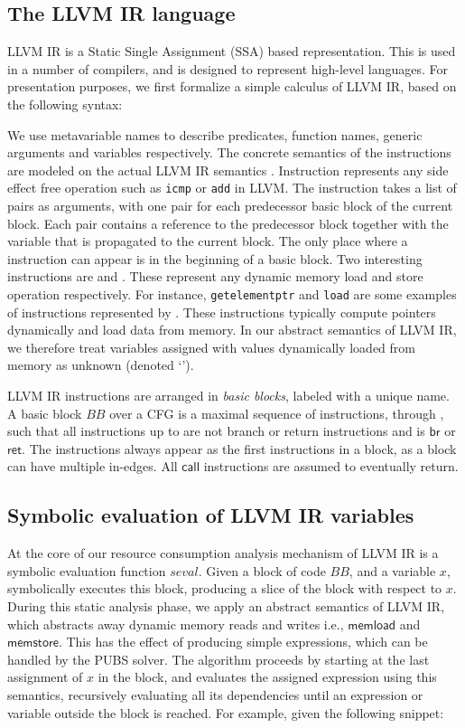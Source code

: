 \documentclass[9pt,preprint]{sigplanconf}
\newcommand{\mathspace}[1]{\ensuremath{#1}\xspace}
\newcommand{\instit}[1]{\mathspace{\mathsf{#1}}}
\newcommand{\aBlock}{\mathspace{\mathit{BB}}}
\newcommand{\aVar}{\mathspace{x}}
\newcommand{\seval}{\mathspace{\mathit{seval}}}
\newcommand{\memload}{\instit{memload}}
\newcommand{\memstore}{\instit{memstore}}
\newcommand{\call}{\instit{call}}
\newcommand{\ret}{\instit{ret}}
\newcommand{\br}{\instit{br}}
\newcommand{\seclabel}[1]{\label{sec:#1}}
\begin{document}
\subsection{The LLVM IR language}
LLVM IR is a Static Single Assignment (SSA) based representation. This is used
in a number of compilers, and is designed to represent high-level
languages. For presentation purposes, we first formalize a simple
calculus of LLVM IR, based on the following syntax:

We use metavariable names  to describe predicates, function names,
generic arguments and variables respectively. The concrete semantics of the
instructions are modeled on the actual LLVM IR
semantics \cite{Zhao:2012:FLI:2103656.2103709}. Instruction  represents any
side effect free operation such as \texttt{icmp} or \texttt{add} in LLVM. The
 instruction takes a
list of pairs as arguments, with one pair for each predecessor basic block of
the current block. Each pair contains a reference to the predecessor block
together with the variable that is propagated to the current block. The only
place where a  instruction can appear is in the beginning of a basic
block. Two interesting instructions are  and . These represent any
dynamic memory load and store operation respectively. For instance,
\texttt{getelementptr} and \texttt{load} are some examples of instructions
represented by . These instructions typically compute pointers dynamically and load
data from memory. In our abstract semantics of LLVM IR, we therefore treat
variables assigned with values dynamically loaded from memory as unknown
(denoted `').

LLVM IR instructions are arranged in \emph{basic blocks}, labeled with
a unique name. A basic block \aBlock over a CFG is a maximal sequence of
instructions,  through , such that all instructions
up to  are not branch or return instructions and  is \br
or \ret. The  instructions always appear as the first instructions in a
block, as a block can have multiple in-edges. All \call instructions are assumed
to eventually return.

\subsection{Symbolic evaluation of LLVM IR variables}\seclabel{seval}
At the core of our resource consumption analysis mechanism of LLVM IR is a symbolic
evaluation function \seval. Given a block of code \aBlock, and a variable \aVar,
 symbolically executes this block, producing a slice
\cite{slicing} of the block with respect to \aVar. During this
static analysis phase, we apply an abstract semantics of LLVM IR, which
abstracts away dynamic memory reads and writes i.e., \memload and
\memstore. This has the effect of producing simple expressions, which can be
handled by the PUBS solver. The algorithm proceeds by starting at the last
assignment of \aVar in the block, and evaluates the assigned expression using
this semantics, recursively evaluating all its dependencies until an expression
or variable outside the block is reached. For example, given the following snippet:
\end{document}

